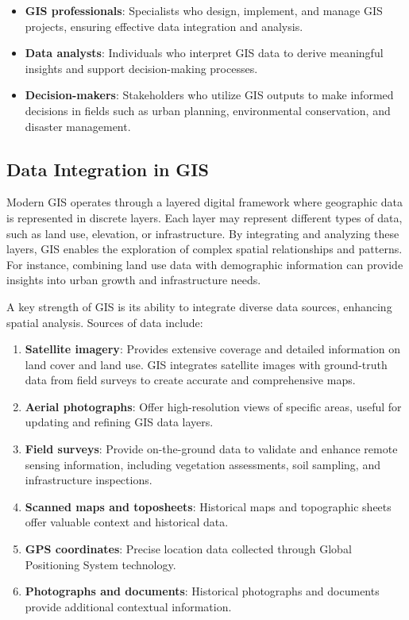 \documentclass[
  12 pt,
]{Nemilov}
\providecommand{\tightlist}{%
  \setlength{\itemsep}{0pt}\setlength{\parskip}{0pt}}
\begin{document}
\begin{enumerate}
  \begin{itemize}
  \tightlist
  \item
    \textbf{GIS professionals}: Specialists who design, implement, and manage GIS projects, ensuring effective data integration and analysis.
  \item
    \textbf{Data analysts}: Individuals who interpret GIS data to derive meaningful insights and support decision-making processes.
  \item
    \textbf{Decision-makers}: Stakeholders who utilize GIS outputs to make informed decisions in fields such as urban planning, environmental conservation, and disaster management.
  \end{itemize}
\end{enumerate}

\subsection{Data Integration in GIS}\label{data-integration-in-gis}

Modern GIS operates through a layered digital framework where geographic data is represented in discrete layers. Each layer may represent different types of data, such as land use, elevation, or infrastructure. By integrating and analyzing these layers, GIS enables the exploration of complex spatial relationships and patterns. For instance, combining land use data with demographic information can provide insights into urban growth and infrastructure needs.

A key strength of GIS is its ability to integrate diverse data sources, enhancing spatial analysis. Sources of data include:

\begin{enumerate}
\def\labelenumi{\arabic{enumi}.}
\item
  \textbf{Satellite imagery}: Provides extensive coverage and detailed information on land cover and land use. GIS integrates satellite images with ground-truth data from field surveys to create accurate and comprehensive maps.
\item
  \textbf{Aerial photographs}: Offer high-resolution views of specific areas, useful for updating and refining GIS data layers.
\item
  \textbf{Field surveys}: Provide on-the-ground data to validate and enhance remote sensing information, including vegetation assessments, soil sampling, and infrastructure inspections.
\item
  \textbf{Scanned maps and toposheets}: Historical maps and topographic sheets offer valuable context and historical data.
\item
  \textbf{GPS coordinates}: Precise location data collected through Global Positioning System technology.
\item
  \textbf{Photographs and documents}: Historical photographs and documents provide additional contextual information.
\end{enumerate}
\end{document}
